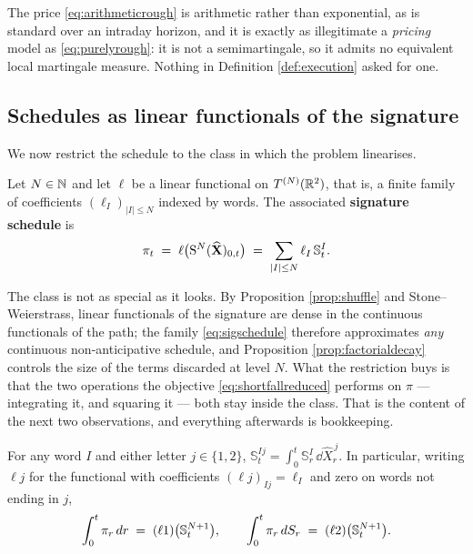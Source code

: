 The price \eqref{eq:arithmeticrough} is arithmetic rather than exponential, as is standard over an
intraday horizon, and it is exactly as illegitimate a \emph{pricing} model as \eqref{eq:purelyrough}:
it is not a semimartingale, so it
admits no equivalent local martingale measure. Nothing in Definition
\ref{def:execution} asked for one.

\subsection{Schedules as linear functionals of the signature}\label{subsec:sigstrategies}

We now restrict the schedule to the class in which the problem linearises.

\begin{definition}\label{def:sigschedule}
Let $N\in\mathbb{N}$ and let $\ell$ be a linear functional on $T^{(N)}(\mathbb{R}^{2})$, that is, a finite family of
coefficients $(\ell_I)_{|I|\leq N}$ indexed by words. The associated \textbf{signature schedule} is
\begin{equation}\label{eq:sigschedule}
  \pi_t \;=\; \ell\bigl(\mathrm{S}^{N}(\widehat{\mathbf{X}})_{0,t}\bigr)\;=\;\sum_{|I|\leq N}\ell_I\,\mathbb{S}^{I}_t .
\end{equation}
\end{definition}

The class is not as special as it looks. By Proposition \ref{prop:shuffle} and Stone--Weierstrass,
linear functionals of the signature are dense in the continuous functionals of the path; the family
\eqref{eq:sigschedule} therefore approximates \emph{any} continuous non-anticipative schedule, and
Proposition \ref{prop:factorialdecay} controls the size of the terms discarded at level $N$. What the
restriction buys is that the two operations the objective \eqref{eq:shortfallreduced} performs on
$\pi$ --- integrating it, and squaring it --- both stay inside the class. That is the content of the
next two observations, and everything afterwards is bookkeeping.

\begin{lemma}\label{lem:concatenation}
For any word $I$ and either letter $j\in\{1,2\}$,
$\mathbb{S}^{Ij}_t=\int_0^t\mathbb{S}^{I}_r\,\dd\widehat X^{\,j}_r$. In particular, writing $\ell j$ for the
functional with coefficients $(\ell j)_{Ij}=\ell_I$ and zero on words not ending in $j$,
\begin{equation}\label{eq:concatenation}
  \int_0^t \pi_r\,d r \;=\; (\ell 1)\bigl(\mathbb{S}^{N+1}_t\bigr),
  \qquad
  \int_0^t \pi_r\,dS_r \;=\; (\ell 2)\bigl(\mathbb{S}^{N+1}_t\bigr).
\end{equation}
\end{lemma}

